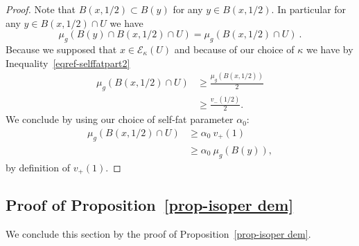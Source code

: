 \documentclass[AHL,Unicode,longabstracts,published]{cedram}
\newcommand{\cE}{\mathcal{E}}
\begin{document}
\begin{proof}
Note that $B(x, 1/2) \subset B(y)$ for any $y \in B(x, 1/2)$. In particular for any $y \in B(x, 1/2) \cap U$ we have
\[
\mu_g\left(B(y) \cap B(x, 1/2) \cap U\right) = \mu_g\left(B(x, 1/2) \cap U\right) \ .
\]
Because we supposed that $x \in \cE_{\kappa}(U)$ and because of our choice of $\kappa$ we have by Inequality~\eqref{eqref-selffatpart2}
\begin{align*}
\mu_g\left(B(x, 1/2) \cap U\right) & \ge \frac{\mu_g(B(x, 1/2))}{2} \\
& \ge \frac{v_-(1/2)}{2}  .
\end{align*}
We conclude by using our choice of self-fat parameter $\alpha_0$:
\begin{align*}
\mu_g\left(B(x, 1/2) \cap U\right) & \ge \alpha_0 \ v_+(1) \\
& \ge \alpha_0 \ \mu_g(B(y)) ,
\end{align*}
by definition of $v_+(1)$. 
\end{proof}

\subsection{Proof of Proposition~\ref{prop-isoper dem}}
We conclude this section by the proof of Proposition~\ref{prop-isoper dem}. 
\end{document}
